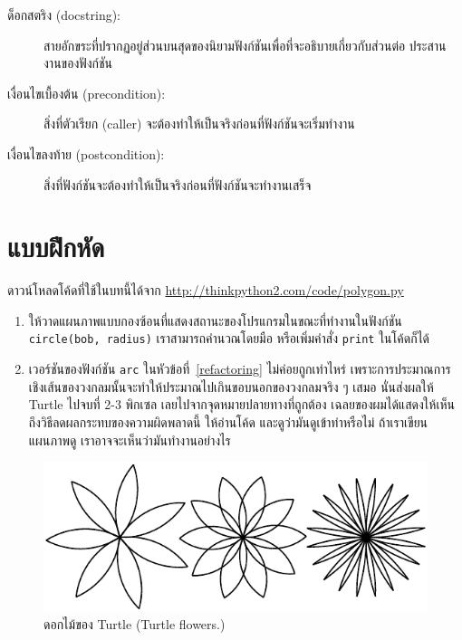 \begin{description}
\item[ด็อกสตริง (docstring):] สายอักขระที่ปรากฏอยู่ส่วนบนสุดของนิยามฟังก์ชันเพื่อที่จะอธิบายเกี่ยวกับส่วนต่อ
ประสานงานของฟังก์ชัน

\item[เงื่อนไขเบื้องต้น (precondition):] สิ่งที่ตัวเรียก (caller) จะต้องทำให้เป็นจริงก่อนที่ฟังก์ชันจะเริ่มทำงาน

\item[เงื่อนไขลงท้าย (postcondition):] สิ่งที่ฟังก์ชันจะต้องทำให้เป็นจริงก่อนที่ฟังก์ชันจะทำงานเสร็จ

\end{description}


\section{แบบฝึกหัด}

\begin{exercise}

ดาวน์โหลดโค้ดที่ใช้ในบทนี้ได้จาก
\url{http://thinkpython2.com/code/polygon.py}

\begin{enumerate}

\item ให้วาดแผนภาพแบบกองซ้อนที่แสดงสถานะของโปรแกรมในขณะที่ทำงานในฟังก์ชัน {\tt circle(bob, radius)}
เราสามารถคำนวณโดยมือ หรือเพิ่มคำสั่ง {\tt print} ในโค้ดก็ได้

\item เวอร์ชันของฟังก์ชัน {\tt arc} ในหัวข้อที่~\ref{refactoring} ไม่ค่อยถูกเท่าไหร่ เพราะการประมาณการ
เชิงเส้นของวงกลมนั้นจะทำให้ประมาณไปเกินขอบนอกของวงกลมจริง ๆ เสมอ นั่นส่งผลให้ Turtle ไปจบที่ 2-3 พิกเซล
เลยไปจากจุดหมายปลายทางที่ถูกต้อง  เฉลยของผมได้แสดงให้เห็นถึงวิธีลดผลกระทบของความผิดพลาดนี้ ให้อ่านโค้ด
และดูว่ามันดูเข้าท่าหรือไม่ ถ้าเราเขียนแผนภาพดู เราอาจจะเห็นว่ามันทำงานอย่างไร

\end{enumerate}

\end{exercise}

\begin{figure}
\centerline
{\includegraphics[scale=0.8]{figs/flowers.pdf}}
\caption{ดอกไม้ของ Turtle (Turtle flowers.)}
\label{fig.flowers}
\end{figure}

